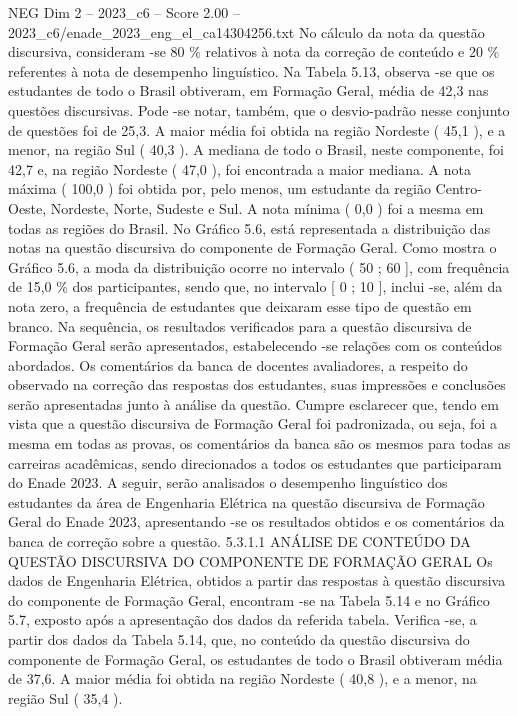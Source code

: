 \begin{textsample}{NEG Dim 2 – 2023\_c6 – Score 2.00 – 2023\_c6/enade\_2023\_eng\_el\_ca14304256.txt}
No cálculo da nota da questão discursiva, consideram -se 80 \% relativos à nota da correção de conteúdo e 20 \% referentes à nota de desempenho linguístico.
Na Tabela 5.13, observa -se que os estudantes de todo o Brasil obtiveram, em Formação Geral, média de 42,3 nas questões discursivas.
Pode -se notar, também, que o desvio-padrão nesse conjunto de questões foi de 25,3.
A maior média foi obtida na região Nordeste ( 45,1 ), e a menor, na região Sul ( 40,3 ).
A mediana de todo o Brasil, neste componente, foi 42,7 e, na região Nordeste ( 47,0 ), foi encontrada a maior mediana.
A nota máxima ( 100,0 ) foi obtida por, pelo menos, um estudante da região Centro-Oeste, Nordeste, Norte, Sudeste e Sul.
A nota mínima ( 0,0 ) foi a mesma em todas as regiões do Brasil.
No Gráfico 5.6, está representada a distribuição das notas na questão discursiva do componente de Formação Geral.
Como mostra o Gráfico 5.6, a moda da distribuição ocorre no intervalo ( 50 ; 60 ], com frequência de 15,0 \% dos participantes, sendo que, no intervalo [ 0 ; 10 ], inclui -se, além da nota zero, a frequência de estudantes que deixaram esse tipo de questão em branco.
Na sequência, os resultados verificados para a questão discursiva de Formação Geral serão apresentados, estabelecendo -se relações com os conteúdos abordados.
Os comentários da banca de docentes avaliadores, a respeito do observado na correção das respostas dos estudantes, suas impressões e conclusões serão apresentadas junto à análise da questão.
Cumpre esclarecer que, tendo em vista que a questão discursiva de Formação Geral foi padronizada, ou seja, foi a mesma em todas as provas, os comentários da banca são os mesmos para todas as carreiras acadêmicas, sendo direcionados a todos os estudantes que participaram do Enade 2023.
A seguir, serão analisados o desempenho linguístico dos estudantes da área de Engenharia Elétrica na questão discursiva de Formação Geral do Enade 2023, apresentando -se os resultados obtidos e os comentários da banca de correção sobre a questão. 5.3.1.1 ANÁLISE DE CONTEÚDO DA QUESTÃO DISCURSIVA DO COMPONENTE DE FORMAÇÃO GERAL Os dados de Engenharia Elétrica, obtidos a partir das respostas à questão discursiva do componente de Formação Geral, encontram -se na Tabela 5.14 e no Gráfico 5.7, exposto após a apresentação dos dados da referida tabela.
Verifica -se, a partir dos dados da Tabela 5.14, que, no conteúdo da questão discursiva do componente de Formação Geral, os estudantes de todo o Brasil obtiveram média de 37,6.
A maior média foi obtida na região Nordeste ( 40,8 ), e a menor, na região Sul ( 35,4 ).

\end{textsample}
